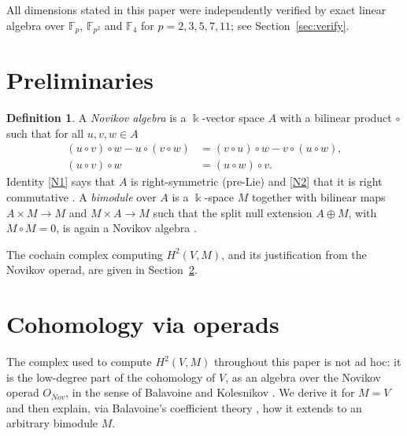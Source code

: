 \documentclass[11pt,reqno]{amsart}
\theoremstyle{plain}
\theoremstyle{definition}
\newtheorem{definition}[theorem]{Definition}
\newcommand{\kk}{\Bbbk}
\newcommand{\Ht}{H^2}
\newcommand{\Fp}{\mathbb{F}_p}
\begin{document}
All dimensions stated in this paper were independently verified by exact linear algebra over
$\Fp$, $\mathbb{F}_{p^2}$ and $\mathbb{F}_4$ for $p=2,3,5,7,11$; see
Section~\ref{sec:verify}.

\section{Preliminaries}\label{sec:prelim}

\begin{definition}\label{def:novikov}
A \emph{Novikov algebra} is a $\kk$-vector space $A$ with a bilinear product $\circ$ such
that for all $u,v,w\in A$
\begin{align}
(u\circ v)\circ w-u\circ(v\circ w)&=(v\circ u)\circ w-v\circ(u\circ w),\tag{N1}\label{N1}\\
(u\circ v)\circ w&=(u\circ w)\circ v.\tag{N2}\label{N2}
\end{align}
Identity \eqref{N1} says that $A$ is right-symmetric (pre-Lie) and \eqref{N2} that it is
right commutative \cite{GelfandDorfman,BalinskiiNovikov}. A \emph{bimodule} over $A$ is a
$\kk$-space $M$ together with bilinear maps $A\times M\to M$ and $M\times A\to M$ such that
the split null extension $A\oplus M$, with $M\circ M=0$, is again a Novikov algebra
\cite{Xu1996,Dzhu1999}.
\end{definition}

The cochain complex computing $\Ht(V,M)$, and its justification from the Novikov operad, are
given in Section~\ref{sec:operad}.

\section{Cohomology via operads}\label{sec:operad}

The complex used to compute $\Ht(V,M)$ throughout this paper is not ad hoc: it is the
low-degree part of the cohomology of $V$, as an algebra over the Novikov operad $O_{Nov}$, in
the sense of Balavoine and Kolesnikov \cite{Balavoine1997,Balavoine1998, kol}. We derive it for $M=V$ and then
explain, via Balavoine's coefficient theory \cite{Balavoine1998}, how it extends to an
arbitrary bimodule $M$.
\end{document}
